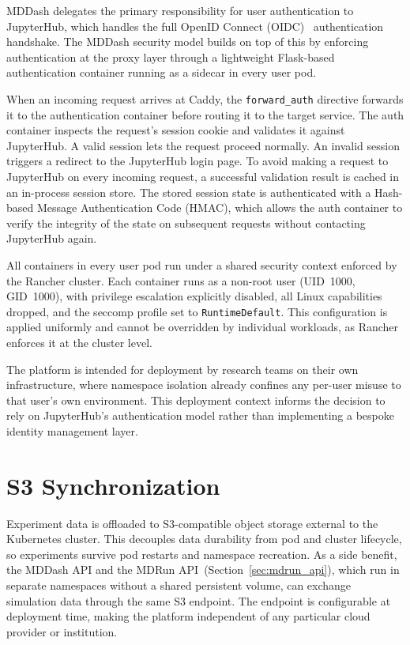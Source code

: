 \documentclass[
  digital,     %
  color,       %
  oneside,     %
  nosansbold,  %
  nocolorbold, %
  lof,         %
  lot,         %
]{fithesis4}
\begin{document}
MDDash delegates the primary responsibility for user authentication to JupyterHub, which handles the full OpenID Connect (OIDC)~\cite{oidc} authentication handshake. The MDDash security model builds on top of this by enforcing authentication at the proxy layer through a lightweight Flask-based authentication container running as a sidecar in every user pod.

When an incoming request arrives at Caddy, the \texttt{forward\_auth} directive forwards it to the authentication container before routing it to the target service. The auth container inspects the request's session cookie and validates it against JupyterHub. A valid session lets the request proceed normally. An invalid session triggers a redirect to the JupyterHub login page. To avoid making a request to JupyterHub on every incoming request, a successful validation result is cached in an in-process session store. The stored session state is authenticated with a Hash-based Message Authentication Code (HMAC), which allows the auth container to verify the integrity of the state on subsequent requests without contacting JupyterHub again.

All containers in every user pod run under a shared security context enforced by the Rancher cluster. Each container runs as a non-root user (UID~1000, GID~1000), with privilege escalation explicitly disabled, all Linux capabilities dropped, and the seccomp profile set to \texttt{RuntimeDefault}. This configuration is applied uniformly and cannot be overridden by individual workloads, as Rancher enforces it at the cluster level.

The platform is intended for deployment by research teams on their own infrastructure, where namespace isolation already confines any per-user misuse to that user's own environment. This deployment context informs the decision to rely on JupyterHub's authentication model rather than implementing a bespoke identity management layer.

\section{S3 Synchronization}
\label{sec:s3_sync}

Experiment data is offloaded to S3-compatible object storage external to the Kubernetes cluster. This decouples data durability from pod and cluster lifecycle, so experiments survive pod restarts and namespace recreation. As a side benefit, the MDDash API and the MDRun API~(Section~\ref{sec:mdrun_api}), which run in separate namespaces without a shared persistent volume, can exchange simulation data through the same S3 endpoint. The endpoint is configurable at deployment time, making the platform independent of any particular cloud provider or institution.
\end{document}
